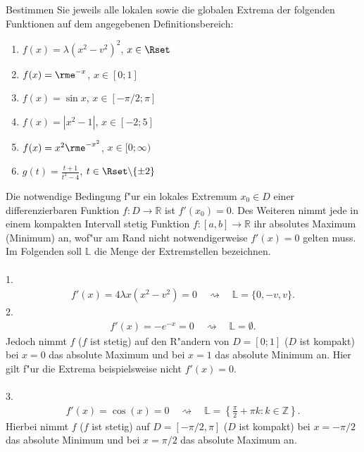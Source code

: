 \documentclass[11pt,answers]{exam}
\begin{document}
\begin{questions}
Bestimmen Sie jeweils alle lokalen sowie die globalen Extrema der folgenden Funktionen auf dem angegebenen Definitionsbereich:\\
\parbox{0.5\textwidth}{\begin{enumerate}
\item $f(x)=\lambda(x^2-v^2)^2$, $x\in\Rset$
\item $f(x)=\rme^{-x}$, $x\in[0;1]$
\item $f(x)=\sin x$, $x\in [-\pi/2;\pi]$
\end{enumerate}}\parbox{0.5\textwidth}{\begin{enumerate}\setcounter{enumi}{3}
\item $f(x)=|x^2-1|$, $x\in[-2;5]$
\item $f(x)=x^2\rme^{-x^2}$, $x\in[0;\infty)$
\item $g(t)=\frac{t+1}{t^2-4}$, $t\in\Rset\backslash\{\pm 2\}$
\end{enumerate}}
\begin{solution} Die notwendige Bedingung f"ur ein lokales Extremum $x_0\in D$ einer differenzierbaren Funktion $f:D\to\mathbb{R}$ ist $f'(x_0)=0$. Des Weiteren nimmt jede in einem kompakten Intervall stetig Funktion $f:[a,b]\to\mathbb{R}$ ihr absolutes Maximum (Minimum) an, wof"ur am Rand nicht notwendigerweise $f'(x)=0$ gelten muss.
\\
Im Folgenden soll $\mathbb{L}$ die Menge der Extremstellen bezeichnen.
\\ \\
1.
\begin{align*}
f'(x)=4 \lambda  x \left(x^2-v^2\right)=0
\quad\rightsquigarrow\quad
\mathbb{L}=\{0,-v,v\}.
\end{align*}
2.
\begin{align*}
f'(x)=-e^{-x}=0
\quad\rightsquigarrow\quad
\mathbb{L}=\emptyset.
\end{align*}
Jedoch nimmt $f$ ($f$ ist stetig) auf den R"andern von $D=[0;1]$ ($D$ ist kompakt) bei $x=0$ das absolute Maximum und bei $x=1$ das absolute Minimum an. Hier gilt f"ur die Extrema beispielsweise nicht $f'(x)=0$.
\\ \\
3.
\begin{align*}
f'(x)=\cos(x)=0
\quad\rightsquigarrow\quad
\mathbb{L}=\left\{\frac{\pi}{2}+\pi k:k\in\mathbb{Z}\right\}.
\end{align*}
Hierbei nimmt $f$ ($f$ ist stetig) auf $D=[-\pi/2,\pi]$ ($D$ ist kompakt) bei $x=-\pi/2$ das absolute Minimum und bei $x=\pi/2$ das absolute Maximum an.
\\ \\

\end{solution}
\end{questions}
\end{document}
